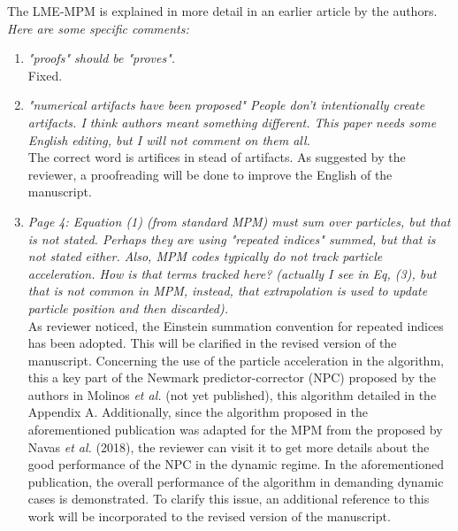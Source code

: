 \documentclass[12pt]{article}
\begin{document}
The LME-MPM is explained in more detail in an earlier article by the authors.
\\

\textit{Here are some specific comments:}

 \begin{enumerate}
 
 \item \textit{"proofs" should be "proves".}\\
 
 Fixed.

 \item \textit{"numerical artifacts have been proposed" People don't intentionally create artifacts. I think authors meant something different. This paper needs some English editing, but I will not comment on them all.}\\
 
The correct word is artifices in stead of artifacts. As suggested by the reviewer, a proofreading will be done to improve the English of the manuscript.
 
 \item \textit{Page 4: Equation (1) (from standard MPM) must sum over particles, but that is not stated. Perhaps they are using "repeated indices" summed, but that is not stated either. Also, MPM codes typically do not track particle acceleration. How is that terms tracked here? (actually I see in Eq, (3), but that is not common in MPM, instead, that extrapolation is used to update particle position and then discarded).}\\
 
As reviewer noticed, the Einstein summation convention for repeated indices has been adopted. This will be clarified in the revised version of the manuscript. Concerning the use of the particle acceleration in the algorithm, this a key part of the Newmark predictor-corrector (NPC) proposed by the authors in Molinos {\it et al.}  \cite{Molinos_2020} (not yet published), this algorithm detailed in the Appendix A. Additionally,  since the algorithm proposed in the aforementioned publication was adapted for the MPM from the proposed by Navas {\it et al.} \cite{Navas_2018a} (2018), the reviewer can visit it to get more details about the good performance of the NPC in the dynamic regime. In the aforementioned publication, the overall performance of the algorithm in demanding dynamic cases is demonstrated. To clarify this issue, an additional reference to this work will be incorporated to the revised version of the manuscript.


\end{enumerate}
\end{document}
